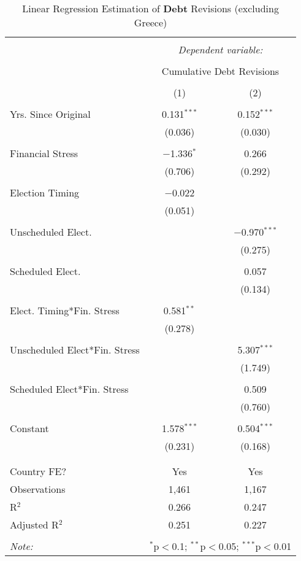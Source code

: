 
\begin{table}[!htbp] \centering 
  \caption{Linear Regression Estimation of \textbf{Debt} Revisions (excluding Greece)} 
  \label{debt_no_greece_results} 
\small 
\begin{tabular}{@{\extracolsep{5pt}}lcc} 
\\[-1.8ex]\hline 
\hline \\[-1.8ex] 
 & \multicolumn{2}{c}{\textit{Dependent variable:}} \\ 
\cline{2-3} 
\\[-1.8ex] & \multicolumn{2}{c}{Cumulative Debt Revisions} \\ 
\\[-1.8ex] & (1) & (2)\\ 
\hline \\[-1.8ex] 
 Yrs. Since Original & 0.131$^{***}$ & 0.152$^{***}$ \\ 
  & (0.036) & (0.030) \\ 
  & & \\ 
 Financial Stress & $-$1.336$^{*}$ & 0.266 \\ 
  & (0.706) & (0.292) \\ 
  & & \\ 
 Election Timing & $-$0.022 &  \\ 
  & (0.051) &  \\ 
  & & \\ 
 Unscheduled Elect. &  & $-$0.970$^{***}$ \\ 
  &  & (0.275) \\ 
  & & \\ 
 Scheduled Elect. &  & 0.057 \\ 
  &  & (0.134) \\ 
  & & \\ 
 Elect. Timing*Fin. Stress & 0.581$^{**}$ &  \\ 
  & (0.278) &  \\ 
  & & \\ 
 Unscheduled Elect*Fin. Stress &  & 5.307$^{***}$ \\ 
  &  & (1.749) \\ 
  & & \\ 
 Scheduled Elect*Fin. Stress &  & 0.509 \\ 
  &  & (0.760) \\ 
  & & \\ 
 Constant & 1.578$^{***}$ & 0.504$^{***}$ \\ 
  & (0.231) & (0.168) \\ 
  & & \\ 
\hline \\[-1.8ex] 
Country FE? & Yes & Yes \\ 
Observations & 1,461 & 1,167 \\ 
R$^{2}$ & 0.266 & 0.247 \\ 
Adjusted R$^{2}$ & 0.251 & 0.227 \\ 
\hline 
\hline \\[-1.8ex] 
\textit{Note:}  & \multicolumn{2}{r}{$^{*}$p$<$0.1; $^{**}$p$<$0.05; $^{***}$p$<$0.01} \\ 
\end{tabular} 
\end{table} 
